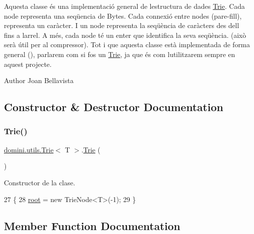 Aquesta classe és una implementació general de l\textquotesingle{}estructura de dades \hyperlink{classdomini_1_1utils_1_1Trie}{Trie}. Cada node representa una seqüencia de Bytes. Cada connexió entre nodes (pare-\/fill), representa un caràcter. I un node representa la seqüència de caràcters des d\textquotesingle{}ell fins a l\textquotesingle{}arrel. A més, cada node té un enter que identifica la seva seqüència. (això serà útil per al compressor). Tot i que aquesta classe està implementada de forma general (), parlarem com si fos un \hyperlink{classdomini_1_1utils_1_1Trie}{Trie}, ja que és com l\textquotesingle{}utilitzarem sempre en aquest projecte.

\begin{DoxyAuthor}{Author}
Joan Bellavista 
\end{DoxyAuthor}


\subsection{Constructor \& Destructor Documentation}
\mbox{\label{classdomini_1_1utils_1_1Trie_aa47b21b235e9dab115f3f97726837d5f}} 
\subsubsection{\texorpdfstring{Trie()}{Trie()}}
{\footnotesize\ttfamily \hyperlink{classdomini_1_1utils_1_1Trie}{domini.\+utils.\+Trie}$<$ T $>$.\hyperlink{classdomini_1_1utils_1_1Trie}{Trie} (\begin{DoxyParamCaption}{ }\end{DoxyParamCaption})\hspace{0.3cm}{\ttfamily [inline]}}



Constructor de la clase. 


\begin{DoxyCode}
27                   \{
28         \hyperlink{classdomini_1_1utils_1_1Trie_a60ef63a6c55d07710d33892ccc899bce}{root} = \textcolor{keyword}{new} TrieNode<T>(-1);
29     \}
\end{DoxyCode}


\subsection{Member Function Documentation}
\mbox{\label{classdomini_1_1utils_1_1Trie_a5c30e36df9ab804bbc054805358ecf2a}} 
